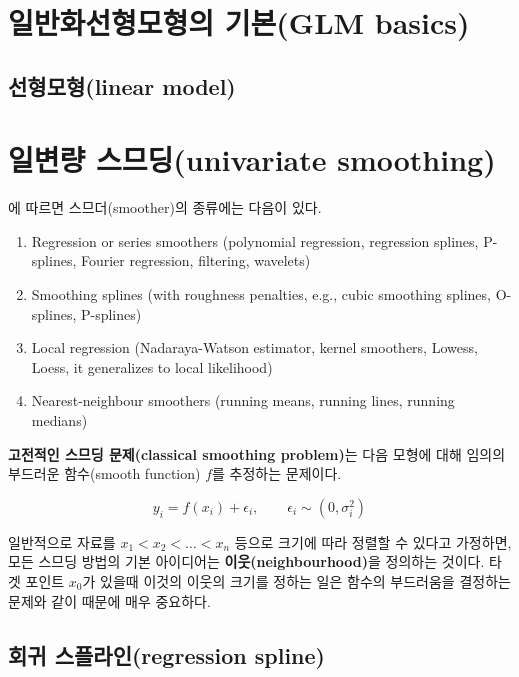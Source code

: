 \documentclass[b5paper,]{scrbook}
\theoremstyle{plain}
\theoremstyle{definition}
\numberwithin{equation}{section}
\begin{document}
\section{일반화선형모형의 기본(GLM basics)}\label{-glm-basics}

\subsection{선형모형(linear model)}\label{linear-model-1}

\section{일변량 스므딩(univariate
smoothing)}\label{-univariate-smoothing}

\citep{Yee2015}에 따르면 스므더(smoother)의 종류에는 다음이 있다.

\begin{enumerate}
\def\labelenumi{\arabic{enumi}.}
\item
  Regression or series smoothers (polynomial regression, regression
  splines, P-splines, Fourier regression, filtering, wavelets)
\item
  Smoothing splines (with roughness penalties, e.g., cubic smoothing
  splines, O-splines, P-splines)
\item
  Local regression (Nadaraya-Watson estimator, kernel smoothers, Lowess,
  Loess, it generalizes to local likelihood)
\item
  Nearest-neighbour smoothers (running means, running lines, running
  medians)
\end{enumerate}

\textbf{고전적인 스므딩 문제(classical smoothing problem)}는 다음 모형에
대해 임의의 부드러운 함수(smooth function) \(f\)를 추정하는 문제이다.

\[y_{i}=f(x_{i})+\epsilon_{i}, \qquad{\epsilon_{i} \sim  (0, \sigma_{i}^{2})}\]

일반적으로 자료를 \(x_{1}<x_{2}<\ldots <x_{n}\) 등으로 크기에 따라
정렬할 수 있다고 가정하면, 모든 스므딩 방법의 기본 아이디어는
\textbf{이웃(neighbourhood)}을 정의하는 것이다. 타겟 포인트 \(x_{0}\)가
있을때 이것의 이웃의 크기를 정하는 일은 함수의 부드러움을 결정하는
문제와 같이 때문에 매우 중요하다.

\subsection{회귀 스플라인(regression spline)}\label{-regression-spline}
\end{document}
